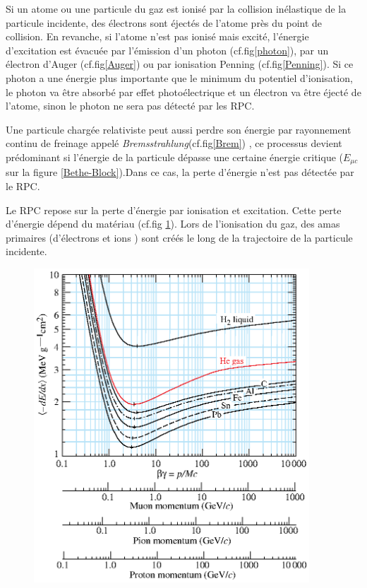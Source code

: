 Si un atome ou une particule du gaz est ionisé par la collision inélastique de la particule incidente, des électrons sont éjectés de l'atome près du point de collision. En revanche, si l'atome n'est pas ionisé mais excité, l'énergie d'excitation est évacuée par l'émission d'un photon (cf.fig\ref{photon}), par un électron d'Auger (cf.fig\ref{Auger}) ou par ionisation Penning (cf.fig\ref{Penning}). Si ce photon a une énergie plus importante que le minimum du potentiel d'ionisation, le photon va être absorbé par effet photoélectrique et un électron va être éjecté de l'atome, sinon le photon ne sera pas détecté par les RPC.

Une particule chargée relativiste peut aussi perdre son énergie par rayonnement continu de freinage appelé \textit{Bremsstrahlung}(cf.fig\ref{Brem}) , ce processus devient prédominant si l'énergie de la particule dépasse une certaine énergie critique ($E_{\mu c}$ sur la figure \ref{Bethe-Block}).Dans ce cas, la perte d'énergie n'est pas détectée par le RPC.

Le RPC repose sur la perte d'énergie par ionisation et excitation. Cette perte d'énergie dépend du matériau (cf.fig \ref{mat}). Lors de l'ionisation du gaz, des amas primaires (d'électrons et ions ) sont créés le long de la trajectoire de la particule incidente. 


\begin{figure}[h!]
	\centering
	\includegraphics[width=0.92\textwidth]{RPC/energylost.eps}
	\label{mat}
\end{figure}

